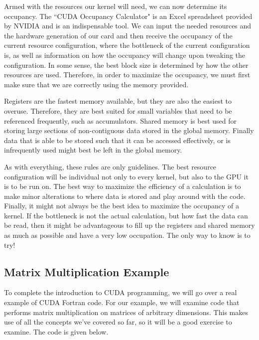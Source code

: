 Armed with the resources our kernel will need, we can now determine its occupancy. The ``CUDA Occupancy Calculator" is an Excel spreadsheet provided by NVIDIA and is an indispensable tool. We can input the needed resources and the hardware generation of our card and then receive the occupancy of the current resource configuration, where the bottleneck of the current configuration is, as well as information on how the occupancy will change upon tweaking the configuration. In some sense, the best block size is determined by how the other resources are used. Therefore, in order to maximize the occupancy, we must first make sure that we are correctly using the memory provided.

Registers are the fastest memory available, but they are also the easiest to overuse. Therefore, they are best suited for small variables that need to be referenced frequently, such as accumulators. Shared memory is best used for storing large sections of non-contiguous data stored in the global memory. Finally data that is able to be stored such that it can be accessed effectively, or is infrequently used might best be left in the global memory.

As with everything, these rules are only guidelines. The best resource configuration will be individual not only to every kernel, but also to the GPU it is to be run on. The best way to maximize the efficiency of a calculation is to make minor alterations to where data is stored and play around with the code. Finally, it might not always be the best idea to maximize the occupancy of a kernel. If the bottleneck is not the actual calculation, but how fast the data can be read, then it might be advantageous to fill up the registers and shared memory as much as possible and have a very low occupation. The only way to know is to try!

\subsection{Matrix Multiplication Example}
To complete the introduction to CUDA programming, we will go over a real example of CUDA Fortran code. For our example, we will examine code that performs matrix multiplication on matrices of arbitrary dimensions. This makes use of all the concepts we've covered so far, so it will be a good exercise to examine. The code is given below.


